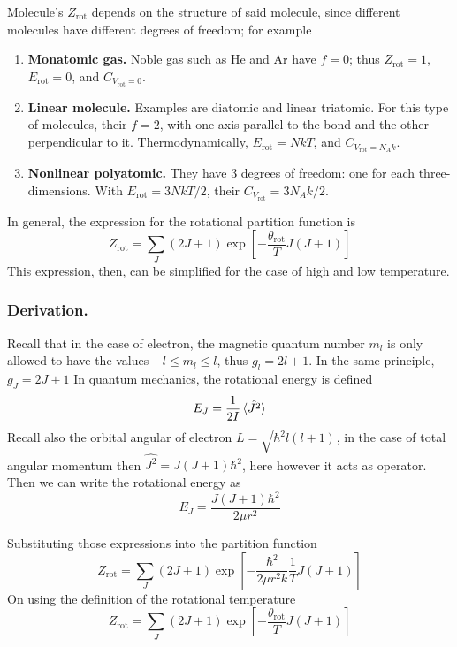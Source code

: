 \documentclass[../../../Main.tex]{subfiles}
\begin{document}
Molecule's $Z_\text{rot}$ depends on the structure of said molecule, since different molecules have different degrees of freedom; for example
\begin{enumerate}
	\item \textbf{Monatomic gas.} Noble gas such as He and Ar have $f=0$; thus $Z_\text{rot}=1$, $E_\text{rot}=0$, and $C_{V_\text{rot}=0}$.
	\item \textbf{Linear molecule.} Examples are diatomic and linear triatomic. For this type of molecules, their $f=2$, with one axis parallel to the bond and the other perpendicular to it. Thermodynamically, $E_\text{rot}=NkT$, and $C_{V_\text{rot}=N_Ak}$.
	\item \textbf{Nonlinear polyatomic.} They have 3 degrees of freedom: one for each three-dimensions. With $E_\text{rot}=3NkT/2$, their $C_{V_\text{rot}}=3N_Ak/2$.
\end{enumerate}

In general, the expression for the rotational partition function is
\begin{equation*}
	Z_\text{rot}=\sum_J(2J+1)\exp\left[-\frac{\theta_\text{rot}}{T}J(J+1)\right]
\end{equation*}
This expression, then, can be simplified for the case of high and low temperature.

\subsubsection*{Derivation.} Recall that in the case of electron, the magnetic quantum number $m_l$ is only allowed to have the values $-l\leq m_l\leq l$, thus $g_l=2l+1$. In the same principle, $g_J=2J+1$ In quantum mechanics, the rotational energy is defined
\begin{equation*}
	E_J=\frac{1}{2I}\braket{\hat{J^2}}
\end{equation*}
Recall also the orbital angular of electron $L=\sqrt{\hbar^2l(l+1)}$, in the case of total angular momentum then $\hat{J^2}= J(J+1)\hbar^2$, here however it acts as operator. Then we can write the rotational energy as
\begin{equation*}
	E_J=\frac{J(J+1)\hbar^2}{2\mu r^2 }
\end{equation*}

Substituting those expressions into the partition function
\begin{equation*}
	Z_\text{rot}=\sum_J(2J+1)\exp\left[-\frac{\hbar^2}{2\mu r^2 k}\frac{1}{T}J(J+1)\right]
\end{equation*}
On using the definition of the rotational temperature
\begin{equation*}
	Z_\text{rot}=\sum_J(2J+1)\exp\left[-\frac{\theta_\text{rot}}{T}J(J+1)\right]
\end{equation*}
\end{document}
